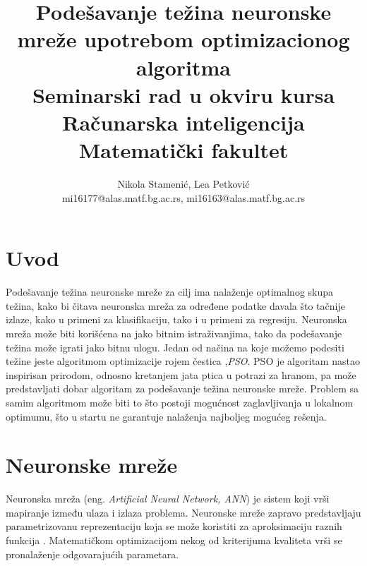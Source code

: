 \documentclass[a4paper]{article}
\begin{document}
\title{Podešavanje težina neuronske mreže upotrebom optimizacionog algoritma\\ \small{Seminarski rad u okviru kursa\\Računarska inteligencija\\ Matematički fakultet}}

\author{Nikola Stamenić, Lea Petković\\ mi16177@alas.matf.bg.ac.rs, mi16163@alas.matf.bg.ac.rs}

\maketitle

\tableofcontents

\newpage

\section{Uvod}
\label{sec:uvod}

Podešavanje težina neuronske mreže za cilj ima nalaženje optimalnog skupa težina, kako bi čitava neuronska mreža za određene podatke
davala što tačnije izlaze, kako u primeni za klasifikaciju, tako i u primeni za regresiju. Neuronska mreža može biti korišćena na jako
bitnim istraživanjima, tako da podešavanje težina može igrati jako bitnu ulogu. Jedan od načina na koje možemo podesiti težine
jeste algoritmom optimizacije rojem čestica ,\emph{PSO}. PSO je algoritam nastao inspirisan prirodom, odnosno kretanjem jata ptica
u potrazi za hranom, pa može predstavljati dobar algoritam za podešavanje težina neuronske mreže. Problem sa samim algoritmom
može biti to što postoji mogućnost zaglavljivanja u lokalnom optimumu, što u startu ne garantuje nalaženja najboljeg mogućeg rešenja.


\section{Neuronske mreže}
\label{neuronskemreze}

Neuronska mreža (eng. \emph{Artificial Neural Network, ANN}) je sistem koji vrši mapiranje između ulaza i izlaza problema.
Neuronske mreže zapravo predstavljaju parametrizovanu reprezentaciju koja se može koristiti za aproksimaciju raznih funkcija \cite{hindawi}.
Matematičkom optimizacijom nekog od kriterijuma kvaliteta vrši se pronalaženje odgovarajućih parametara. 
\end{document}
